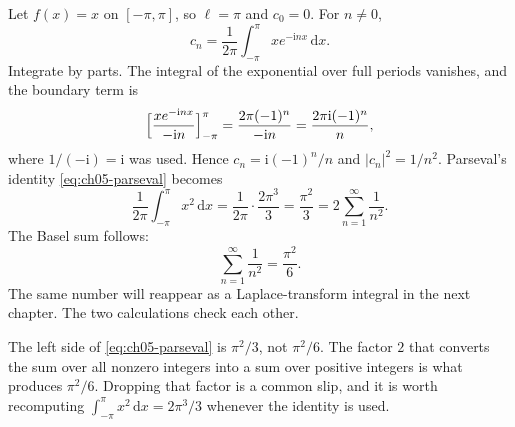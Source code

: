 \begin{example}
Let $f(x)=x$ on $[-\pi,\pi]$, so $\ell=\pi$ and $c_0=0$. For $n\neq 0$,
\begin{equation}
c_n=\frac{1}{2\pi}\int_{-\pi}^{\pi}x e^{-\mathrm{i}nx}\,\mathrm{d}x.
\end{equation}
Integrate by parts. The integral of the exponential over full periods vanishes, and the boundary term is
\begin{equation}
\Bigl[\frac{x e^{-\mathrm{i}nx}}{-{\mathrm{i}n}}\Bigr]_{-\pi}^{\pi}
=\frac{2\pi(-1)^n}{-{\mathrm{i}n}}
=\frac{2\pi\mathrm{i}(-1)^n}{n},
\end{equation}
where $1/(-\mathrm{i})=\mathrm{i}$ was used. Hence $c_n=\mathrm{i}(-1)^n/n$ and $|c_n|^2=1/n^2$. Parseval's identity \eqref{eq:ch05-parseval} becomes
\begin{equation}
\frac{1}{2\pi}\int_{-\pi}^{\pi}x^2\,\mathrm{d}x
=\frac{1}{2\pi}\cdot\frac{2\pi^3}{3}
=\frac{\pi^2}{3}
=2\sum_{n=1}^{\infty}\frac{1}{n^2}.
\end{equation}
The Basel sum follows:
\begin{equation}
\sum_{n=1}^{\infty}\frac{1}{n^2}=\frac{\pi^2}{6}.
\label{eq:ch05-basel}
\end{equation}
The same number will reappear as a Laplace-transform integral in the next chapter. The two calculations check each other.
\end{example}

\begin{note}
The left side of \eqref{eq:ch05-parseval} is $\pi^2/3$, not $\pi^2/6$. The factor $2$ that converts the sum over all nonzero integers into a sum over positive integers is what produces $\pi^2/6$. Dropping that factor is a common slip, and it is worth recomputing $\int_{-\pi}^{\pi}x^2\,\mathrm{d}x=2\pi^3/3$ whenever the identity is used.
\end{note}
